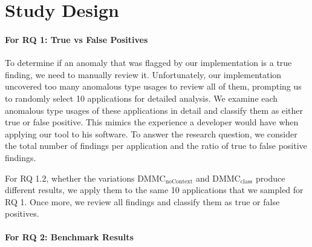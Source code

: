 \section{Study Design}

\paragraph{For RQ 1: True vs False Positives}

To determine if an anomaly that was flagged by our implementation is a true finding, we need to manually review it.
Unfortunately, our implementation uncovered too many anomalous type usages to review all of them, prompting us to randomly select 10 applications for detailed analysis.
We examine each anomalous type usages of these applications in detail and classify them as either true or false positive.
This mimics the experience a developer would have when applying our tool to his software.
To answer the research question, we consider the total number of findings per application and the ratio of true to false positive findings.

For RQ 1.2, whether the variations $\text{DMMC}_\text{noContext}$ and $\text{DMMC}_\text{class}$ produce different results, we apply them to the same 10 applications that we sampled for RQ 1.
Once more, we review all findings and classify them as true or false positives.

\paragraph{For RQ 2: Benchmark Results}

